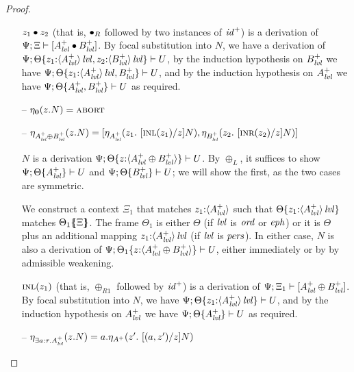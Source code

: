 \begin{proof}
\begin{itemize}
  $\tfuser{z_1}{z_2}$ (that is, ${\fuse}_R$ followed by two instances of 
  ${\it id}^+$) is a derivation of 
  $\foc{\Psi}{\Xi}{[A^+_\mlvl \fuse B^+_\mlvl]}$.
  By focal substitution into $N$, we have
  a derivation of 
  $\foc{\Psi}{\tackon{\Theta}
              {\mkconj{z_1{:}\islvl{\susp{A^+_\mlvl}}}
                      {z_2{:}\islvl{\susp{B^+_\mlvl}}}}}{U}$,
  by the induction hypothesis on $B^+_\mlvl$ we have
  $\foc{\Psi}{\tackon{\Theta}
              {\mkconj{z_1{:}\islvl{\susp{A^+_\mlvl}}}
                      {B^+_\mlvl}}}{U}$, and by
  the induction hypothesis on $A^+_\mlvl$ we have
   $\foc{\Psi}{\tackon{\Theta}
              {\mkconj{A^+_\mlvl}
                      {B^+_\mlvl}}}{U}$ as required.
  \smallskip
 

\item[--] $\etapa{z}{N}{\zero} = \tabort$ 

\item[--] $\etapa{z}{N}{A^+_\mlvl \oplus B^+_\mlvl} = 
           \toplusl
            {\etapa{z_1}{~[\tinl{z_1}/z]N}{A^+_\mlvl}}
            {\etapa{z_2}{~[\tinr{z_2}/z]N}{B^+_\mlvl}}$
\smallskip

$N$ is a derivation 
$\foc{\Psi}{\tackon{\Theta}{z{:}\susp{A^+_\mlvl \oplus B^+_\mlvl}}}{U}$.
By $\oplus_L$, it suffices to show 
$\foc{\Psi}{\tackon{\Theta}{A^+_\mlvl}}{U}$
and
$\foc{\Psi}{\tackon{\Theta}{B^+_\mlvl}}{U}$; we will show the first, as the
two cases are symmetric. 
\smallskip

We construct a context $\Xi_1$ that matches $z_1{:}\susp{A^+_\mlvl}$
such that $\tackon{\Theta}{z_1{:}\islvl{\susp{A^+_\mlvl}}}$ matches
$\frameoff{\Theta_1}{\Xi}$. The frame $\Theta_1$ is either 
$\Theta$ (if $\mlvl$ is $\mtrue$ or $\meph$) or it is $\Theta$
plus an additional mapping $z_1{:}\islvl{\susp{A^+_\mlvl}}$ (if
$\mlvl$ is $\mpers$). In either case, $N$ is also a derivation
of $\foc{\Psi}{\tackon{\Theta_1}{z{:}\susp{A^+_\mlvl \oplus B^+_\mlvl}}}{U}$,
either immediately or by by admissible weakening.
\smallskip

$\tinl{z_1}$ (that is, $\oplus_{R1}$ followed by ${\it id}^+$) is a
derivation of $\foc{\Psi}{\Xi_1}{[A^+_\mlvl \oplus B^+_\mlvl]}$.  By
focal substitution into $N$, we have 
$\foc{\Psi}{\tackon{\Theta}{z_1{:}\islvl{\susp{A^+_\mlvl}}}}{U}$, and by the
induction hypothesis on $A^+_\mlvl$ we have 
$\foc{\Psi}{\tackon{\Theta}{A^+_\mlvl}}{U}$ as required.
\smallskip

\item[--] $\etapa{z}{N}{\exists a{:}\tau. A^+_\mlvl} 
           = \texistsl{a}
              {\etapa{z'}
                {~[(\texistsr{a}{z'})/z]N}
                {A^+}}$ 
\smallskip


\end{itemize}
\end{proof}
